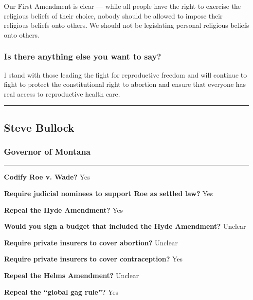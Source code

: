 Our First Amendment is clear --- while all people have the right to
exercise the religious beliefs of their choice, nobody should be allowed
to impose their religious beliefs onto others. We should not be
legislating personal religious beliefs onto others.

\hypertarget{is-there-anything-else-you-want-to-say-1}{%
\subsubsection{Is there anything else you want to
say?}\label{is-there-anything-else-you-want-to-say-1}}

I stand with those leading the fight for reproductive freedom and will
continue to fight to protect the constitutional right to abortion and
ensure that everyone has real access to reproductive health care.

\begin{center}\rule{0.5\linewidth}{\linethickness}\end{center}

\hypertarget{steve-bullock}{%
\subsection{Steve Bullock}\label{steve-bullock}}

\hypertarget{governor-of-montana}{%
\subsubsection{Governor of Montana}\label{governor-of-montana}}

\begin{center}\rule{0.5\linewidth}{\linethickness}\end{center}

\textbf{Codify Roe v. Wade?} Yes

\textbf{Require judicial nominees to support Roe as settled law?} Yes

\textbf{Repeal the Hyde Amendment?} Yes

\textbf{Would you sign a budget that included the Hyde Amendment?}
Unclear

\textbf{Require private insurers to cover abortion?} Unclear

\textbf{Require private insurers to cover contraception?} Yes

\textbf{Repeal the Helms Amendment?} Unclear

\textbf{Repeal the ``global gag rule''?} Yes

